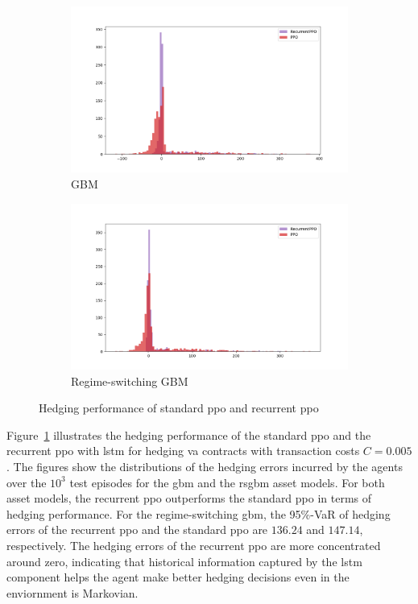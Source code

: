\begin{figure}[ht!]
    \centering
    \begin{subfigure}{0.45\textwidth}
        \includegraphics[width=\textwidth]{./futureWork/figures/PPOs_GBM.png}
        \caption{GBM}
    \end{subfigure}
    \hspace{1cm}
    \begin{subfigure}{0.45\textwidth}
        \includegraphics[width=\textwidth]{./futureWork/figures/PPOs_GBMRS.png}
        \caption{Regime-switching GBM}
    \end{subfigure}
    \caption{Hedging performance of standard \gls{ppo} and recurrent \gls{ppo}} 
    \label{fig3:ppo_result}
\end{figure}

Figure~\ref{fig3:ppo_result} illustrates the hedging performance of the standard \gls{ppo} and the recurrent \gls{ppo} with \gls{lstm} for hedging \gls{va} contracts with transaction costs $C=0.005$.
The figures show the distributions of the hedging errors incurred by the agents over the $10^3$ test episodes for the \gls{gbm} and the \gls{rsgbm} asset models.
For both asset models, the recurrent \gls{ppo} outperforms the standard \gls{ppo} in terms of hedging performance.
For the regime-switching \gls{gbm}, the 95\%-VaR of hedging errors of the recurrent \gls{ppo} and the standard \gls{ppo} are $136.24$ and $147.14$, respectively.
The hedging errors of the recurrent \gls{ppo} are more concentrated around zero, indicating that historical information captured by the \gls{lstm} component helps the agent make better hedging decisions even in the enviornment is Markovian.

